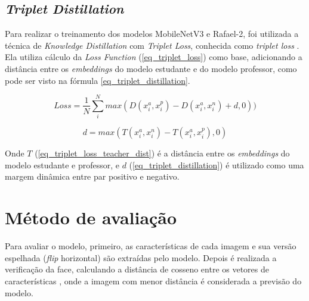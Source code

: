 \subsection{\textit{Triplet Distillation}}
Para realizar o treinamento dos modelos MobileNetV3 e Rafael-2, foi utilizada a técnica de
\textit{Knowledge Distillation} \cite{hinton2015distilling} com \textit{Triplet Loss}, conhecida como
\textit{triplet loss} \cite{triplet_distillation_face_recognition}.
Ela utiliza cálculo da \textit{Loss Function} (\ref{eq_triplet_loss}) como base, adicionando a distância entre os
\textit{embeddings} do modelo estudante e do modelo professor, como pode ser visto na fórmula
\ref{eq_triplet_distillation}.

\begin{equation}\label{eq_triplet_distillation}
	Loss = \frac 1 N \sum _i ^N max(D(x_i^a, x_i^p) - D(x_i^a, x_i^n) + d, 0))
\end{equation}

\begin{equation}\label{eq_triplet_loss_teacher_dist}
	d = max(T(x_i^a, x_i^n) - T(x_i^a, x_i^p), 0)
\end{equation}

Onde $T$ (\ref{eq_triplet_loss_teacher_dist}) é a distância entre os \textit{embeddings} do modelo estudante e
professor, e $d$ (\ref{eq_triplet_distillation}) é utilizado como uma margem dinâmica entre par positivo e negativo.


\section{Método de avaliação}\label{sec_avaliacao_modelo}
Para avaliar o modelo, primeiro, as características de cada imagem e sua versão espelhada
(\textit{flip} horizontal) são extraídas pelo modelo. Depois é realizada a verificação da face,
calculando a distância de cosseno entre os vetores de características
\cite{triplet_distillation_face_recognition}, onde a imagem com menor distância é considerada a previsão do
modelo.


